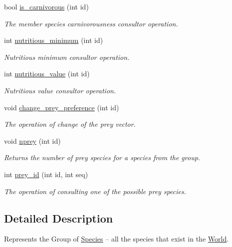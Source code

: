 \begin{DoxyCompactItemize}
bool \hyperlink{class_grp_species_a40bca706f2c7ff5c29ad64efef91f5b0}{is\-\_\-carnivorous} (int id)
\begin{DoxyCompactList}\small\item\em The member species carnivorousness consultor operation. \end{DoxyCompactList}\item 
int \hyperlink{class_grp_species_ad805d0ed7ae160591693a234cf13383e}{nutritious\-\_\-minimum} (int id)
\begin{DoxyCompactList}\small\item\em Nutritious minimum consultor operation. \end{DoxyCompactList}\item 
int \hyperlink{class_grp_species_ac1d5b1342c36aea055cc6bee2215f187}{nutritious\-\_\-value} (int id)
\begin{DoxyCompactList}\small\item\em Nutritious value consultor operation. \end{DoxyCompactList}\item 
void \hyperlink{class_grp_species_a5d5691f011fe8f195d3297f08a0596d7}{change\-\_\-prey\-\_\-preference} (int id)
\begin{DoxyCompactList}\small\item\em The operation of change of the prey vector. \end{DoxyCompactList}\item 
void \hyperlink{class_grp_species_acc72b9877cd8d59671a96762b51d87a1}{nprey} (int id)
\begin{DoxyCompactList}\small\item\em Returns the number of prey species for a species from the group. \end{DoxyCompactList}\item 
int \hyperlink{class_grp_species_ac486dcdf1d36b9935b396335f4567b6c}{prey\-\_\-id} (int id, int seq)
\begin{DoxyCompactList}\small\item\em The operation of consulting one of the possible prey species. \end{DoxyCompactList}\end{DoxyCompactItemize}


\subsection{Detailed Description}
Represents the Group of \hyperlink{class_species}{Species} – all the species that exist in the \hyperlink{class_world}{World}. 

